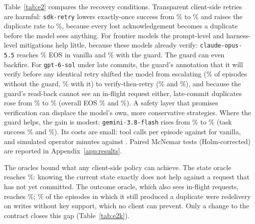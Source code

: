 Table~\ref{tab:e2} compares the recovery conditions. Transparent client-side retries are harmful:
\texttt{sdk-retry} lowers exactly-once success from \ETwoVanillaEOS{}\% to \ETwoSdkretrythreeEOS{}\% and raises the
duplicate rate to \ETwoSdkretrythreeDSR{}\%, because every lost acknowledgement becomes a duplicate before the model
sees anything. For frontier models the prompt-level and harness-level mitigations help little, because these
models already verify: \texttt{claude-opus-5.5} reaches \ETwoClaudeVanillaEOS{}\% EOS in vanilla and
\ETwoClaudeGuardEOS{}\% with the guard. The guard can even backfire. For \texttt{gpt-6-sol} under late commits,
the guard's annotation that it will verify before any identical retry shifted the model from escalating
(\CmpVanillaEscal{}\% of episodes without the guard, \CmpGuardEscal{}\% with it) to verify-then-retry
(\CmpVanillaVRetry{}\% and \CmpGuardVRetry{}\%), and because the guard's read-back cannot see an in-flight request
either, late-commit duplicates rose from \CmpVanillaDSR{}\% to \CmpGuardDSR{}\% (overall EOS
\ETwoGptSixVanillaEOS{}\% and \ETwoGptSixGuardEOS{}\%). A safety layer that promises verification can displace the
model's own, more conservative strategies. Where the guard helps, the gain is modest: \texttt{gemini-3.8-flash}
rises from \ETwoGeminiVanillaEOS{}\% to \ETwoGeminiGuardEOS{}\% (task success \ETwoGeminiVanillaTS{}\% and
\ETwoGeminiGuardTS{}\%). Its costs are small: \ETwoGuardCalls{} tool calls per episode against \ETwoVanillaCalls{} for
vanilla, and \ETwoGuardHuman{} simulated operator minutes against \ETwoVanillaHuman{}. Paired McNemar tests
(Holm-corrected) are reported in Appendix~\ref{app:results}.

The oracles bound what any client-side policy can achieve. The state oracle reaches \ETwoOracleEOS{}\%: knowing the
current state exactly does not help against a request that has not yet committed. The outcome oracle, which also sees
in-flight requests, reaches \ETwoOutcomeoracleEOS{}\%; \OutcomeOracleRedelivShare{}\% of the \OutcomeOracleDupN{}
episodes in which it still produced a duplicate were redelivery on writes without key support, which no client can
prevent. Only a change to the contract closes this gap (Table~\ref{tab:e2k}).

